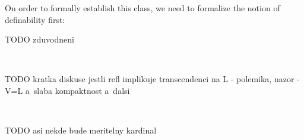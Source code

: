 \documentclass[12pt,a4paper]{article}
\newtheorem{definition}[theorem]{Definition}
\newtheorem{Fact}[theorem]{Fact}
\newcommand{\bce}{\begin{compactenum}}
\newcommand{\ece}{\end{compactenum}}
\begin{document}
On order to formally establish this class, we need to formalize the notion of definability first:
{\color{red}
\begin{comment}

\begin{definition}[Definable sets]
\begin{equation}
Def(X) := \{\{{y | x }\in X \land \langle X, \in \rangle \models \varphi(y, z_1,\ldots,z_n) \} |\mbox{ }\varphi\mbox{ is a~first-order formula, }z_1,\ldots,z_n \in X \}
\end{equation}
\end{definition}

Now we can recursively build $L$.
\begin{definition}[The Constructible universe\newline]
\bce[(i)]
\item
\begin{equation}
L_0 := \emptyset
\end{equation}

\item
\begin{equation}
L_{\alpha+1} := Def(L_{\alpha})
\end{equation}
\item
\begin{equation}
L_{\lambda} = \bigcup_{\alpha < \lambda} L_{\alpha}\mbox{ If }\lambda\mbox{ is a~limit ordinal }
\end{equation}
\item
\begin{equation}
L = \bigcup_{\alpha\in Ord} L_{\alpha}
\end{equation}
\ece
\end{definition}

TODO Plagiat -- prepsat a~vysvetlit
\begin{Fact}
The reflection -- constructed as explained in the previous paragraph (!!! preformulovat !!!) -- with second-order parameters for higher-order formulas (even of transfinite type) does not yield transcendence over $L$.
\end{Fact}

\end{comment}
}

TODO zduvodneni

\

TODO kratka diskuse jestli refl implikuje transcendenci na L - polemika, nazor - V=L a~slaba kompaktnost a~dalsi

\

TODO asi nekde bude meritelny kardinal
\newpage
\end{document}
